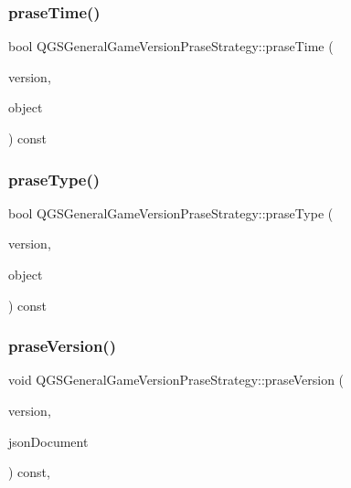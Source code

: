 \subsubsection{\texorpdfstring{prase\+Time()}{praseTime()}}
{\footnotesize\ttfamily bool Q\+G\+S\+General\+Game\+Version\+Prase\+Strategy\+::prase\+Time (\begin{DoxyParamCaption}\item[{\mbox{\hyperlink{class_q_g_s_game_version}{Q\+G\+S\+Game\+Version}} \&}]{version,  }\item[{const Q\+Json\+Object \&}]{object }\end{DoxyParamCaption}) const\hspace{0.3cm}{\ttfamily [protected]}}

\mbox{\label{class_q_g_s_general_game_version_prase_strategy_a74941876ccf051cb95e34802bb176724}} 
\subsubsection{\texorpdfstring{prase\+Type()}{praseType()}}
{\footnotesize\ttfamily bool Q\+G\+S\+General\+Game\+Version\+Prase\+Strategy\+::prase\+Type (\begin{DoxyParamCaption}\item[{\mbox{\hyperlink{class_q_g_s_game_version}{Q\+G\+S\+Game\+Version}} \&}]{version,  }\item[{const Q\+Json\+Object \&}]{object }\end{DoxyParamCaption}) const\hspace{0.3cm}{\ttfamily [protected]}}

\mbox{\label{class_q_g_s_general_game_version_prase_strategy_a97b6266d0c89c224a8d70a9187c8bfca}} 
\subsubsection{\texorpdfstring{prase\+Version()}{praseVersion()}}
{\footnotesize\ttfamily void Q\+G\+S\+General\+Game\+Version\+Prase\+Strategy\+::prase\+Version (\begin{DoxyParamCaption}\item[{\mbox{\hyperlink{class_q_g_s_game_version}{Q\+G\+S\+Game\+Version}} \&}]{version,  }\item[{Q\+Json\+Document \&}]{json\+Document }\end{DoxyParamCaption}) const\hspace{0.3cm}{\ttfamily [override]}, {\ttfamily [virtual]}}



